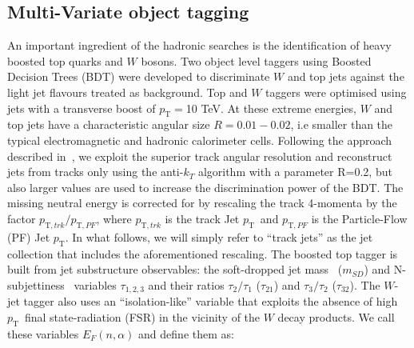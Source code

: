 \documentclass[a4paper,11pt]{article}
\newcommand{\ptSub}[1]{\ensuremath{p_{\text{T} #1}}}
\newcommand{\ptSup}[1]{\ensuremath{p_{\text{T}}^{#1}}}
\newcommand{\pt}{\ensuremath{p_{\text{T}}}}
\newcommand{\mSD}{\ensuremath{m_{\ensuremath{SD}}}}
\begin{document}
\subsection{Multi-Variate object tagging}
\label{subsec:mvatagger}

An important ingredient of the hadronic searches is the identification of heavy boosted top quarks and $W$ bosons. Two object level taggers using Boosted Decision Trees (BDT) were developed to discriminate $W$ and top jets against the light jet flavours treated as background.
Top and $W$ taggers were optimised using jets with a transverse boost of $\pt=$10 TeV. At these extreme energies, $W$ and top jets have a characteristic angular size $R=0.01-0.02$, i.e smaller than the typical electromagnetic and hadronic calorimeter cells. Following the approach described in~\cite{Larkoski:2015yqa}, we exploit the superior track angular resolution and reconstruct jets from tracks only using the anti-$k_T$ algorithm with a parameter R=0.2, but also larger values are used to increase the discrimination power of the BDT. The missing neutral energy is corrected for by rescaling the track 4-momenta by the factor $\ptSub{,trk}/\ptSub{,PF}$, where $\ptSub{,trk}$ is the track Jet \pt\ and $\ptSub{,PF}$ is the Particle-Flow (PF) Jet \pt. In what follows, we will simply refer to ``track jets'' as the jet collection that includes the aforementioned rescaling. The boosted top tagger is built from jet substructure observables: the soft-dropped jet mass~\cite{Larkoski:2014wba} (\mSD) and N-subjettiness~\cite{Thaler:2010tr} variables $\tau_{1,2,3}$ and their ratios $\tau_{2}/\tau_{1}$ ($\tau_{21}$) and $\tau_{3}/\tau_{2}$ ($\tau_{32}$). The $W$-jet tagger also uses an ``isolation-like'' variable that exploits the absence of high \pt\ final state-radiation (FSR) in the vicinity of the $W$ decay products. We call these variables $E_{F}(n,\alpha)$ and define them as:

\end{document}
